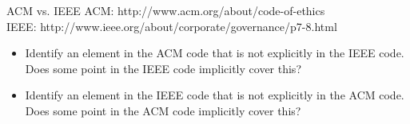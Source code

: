 \documentclass{beamer}
\begin{document}
\begin{frame}{ACM vs. IEEE}
ACM: http://www.acm.org/about/code-of-ethics \\
IEEE: http://www.ieee.org/about/corporate/governance/p7-8.html
\bigskip
\begin{itemize}
\item Identify an element in the ACM code that is not explicitly in the IEEE code. Does some point in the IEEE code implicitly cover this?
\item Identify an element in the IEEE code that is not explicitly in the ACM code. Does some point in the ACM code implicitly cover this?
\end{itemize}
\end{frame}

\end{document}
